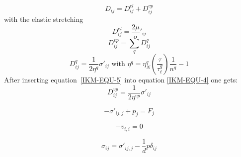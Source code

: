 \begin{equation}\label{IKM-EQU-2}
D_{ij}=D_{ij}^{el}+D_{ij}^{vp}
\end{equation}
with the elastic stretching
\begin{equation}\label{IKM-EQU-3}
D_{ij}^{el}=\frac{2 \mu} \sigma'_{ij}
\end{equation}
\begin{equation}\label{IKM-EQU-4}
D_{ij}^{vp}=\sum_{q} D_{ij}^{q}
\end{equation}
\begin{equation}\label{IKM-EQU-5}
D_{ij}^{q}=\frac{1}{2 \eta^{q}} \sigma'_{ij} \mbox{ with } \eta^{q}=\eta^{q}_N \left(\frac{\tau}{\tau_t^q}\right){\frac{1}{n^{q}}-1}
\end{equation}
After inserting equation~\ref{IKM-EQU-5} into equation \ref{IKM-EQU-4} one gets:
\begin{equation}\label{IKM-EQU-4}
D_{ij}^{vp}=\frac{1}{2 \eta^{vp}} \sigma'_{ij}
\end{equation}


\begin{equation}\label{IKM-EQU-1}
-\sigma'_{ij,j}+p_j=F_j
\end{equation}

\begin{equation}\label{IKM-EQU-2}
-v_{i,i}=0
\end{equation}

\begin{equation}\label{IKM-EQU-3}
\sigma_{ij}=\sigma'_{ij,j}-\frac{1}{d} p \delta_{ij}
\end{equation}
